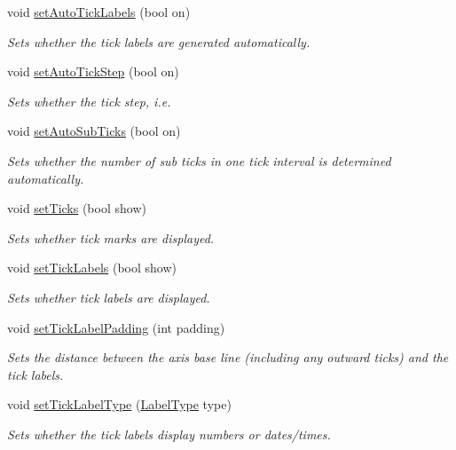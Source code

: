 \begin{DoxyCompactItemize}
void \hyperlink{classQCPAxis_aaa47e3a6bac0c20d4beb9028f01bc1a1}{set\+Auto\+Tick\+Labels} (bool on)
\begin{DoxyCompactList}\small\item\em Sets whether the tick labels are generated automatically. \end{DoxyCompactList}\item 
void \hyperlink{classQCPAxis_a99fe77b034e06f5b723995beab96e741}{set\+Auto\+Tick\+Step} (bool on)
\begin{DoxyCompactList}\small\item\em Sets whether the tick step, i.\+e. \end{DoxyCompactList}\item 
void \hyperlink{classQCPAxis_adcbdec7a60054b88571e89599f4a45bf}{set\+Auto\+Sub\+Ticks} (bool on)
\begin{DoxyCompactList}\small\item\em Sets whether the number of sub ticks in one tick interval is determined automatically. \end{DoxyCompactList}\item 
void \hyperlink{classQCPAxis_ac891409315bc379e3b1abdb162c1a011}{set\+Ticks} (bool show)
\begin{DoxyCompactList}\small\item\em Sets whether tick marks are displayed. \end{DoxyCompactList}\item 
void \hyperlink{classQCPAxis_a04ba16e1f6f78d70f938519576ed32c8}{set\+Tick\+Labels} (bool show)
\begin{DoxyCompactList}\small\item\em Sets whether tick labels are displayed. \end{DoxyCompactList}\item 
void \hyperlink{classQCPAxis_af302c479af9dbc2e9f0e44e07c0012ee}{set\+Tick\+Label\+Padding} (int padding)
\begin{DoxyCompactList}\small\item\em Sets the distance between the axis base line (including any outward ticks) and the tick labels. \end{DoxyCompactList}\item 
void \hyperlink{classQCPAxis_a54f24f5ce8feea25209388a863d7e448}{set\+Tick\+Label\+Type} (\hyperlink{classQCPAxis_a4a7da0166f755f5abac23b765d184cad}{Label\+Type} type)
\begin{DoxyCompactList}\small\item\em Sets whether the tick labels display numbers or dates/times. \end{DoxyCompactList}\item 

\end{DoxyCompactItemize}
